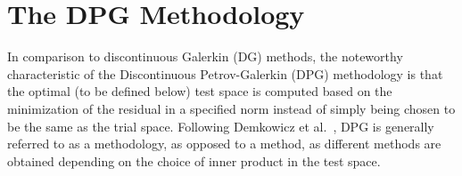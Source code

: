 \chapter{The DPG Methodology}

In comparison to discontinuous Galerkin (DG) methods, the noteworthy characteristic of the Discontinuous
Petrov-Galerkin (DPG) methodology is that the optimal (to be defined below) test space is computed based on the
minimization of the residual in a specified norm instead of simply being chosen to be the same as the trial space.
Following Demkowicz et al.~\cite{Demkowicz2017}, DPG is generally referred to as a methodology, as opposed to
a method, as different methods are obtained depending on the choice of inner product in the test space.



